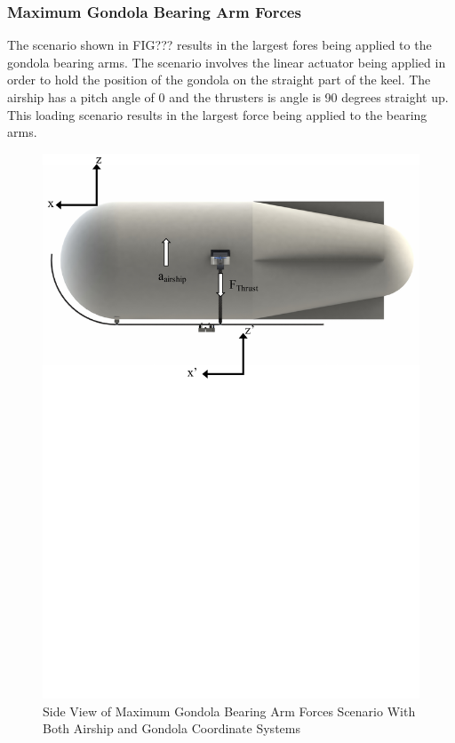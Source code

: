 \documentclass[../main.tex]{subfiles}
\begin{document}
\subsubsection*{Maximum Gondola Bearing Arm Forces}
The scenario shown in FIG??? results in the largest fores being applied to the gondola bearing arms. The scenario involves the linear actuator being applied in order to hold the position of the gondola on the straight part of the keel. The airship has a pitch angle of 0 and the thrusters is  angle is 90 degrees straight up. This loading scenario results in the largest force  being applied to the bearing arms.
\begin{figure}[H]
	\centering
	\includegraphics[width=1\textwidth]{img/analysis/scenario2.pdf}
	\caption{Side View of Maximum Gondola Bearing Arm Forces Scenario With Both Airship and Gondola Coordinate Systems}
	\label{fig:scenario2}
\end{figure}
\end{document}
